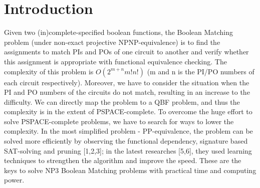\section{Introduction}
Given two (in)complete-specified boolean functions, the Boolean Matching problem (under non-exact projective NPNP-equivalence) is to find the assignments to match PIs and POs of one circuit to another and verify whether this assignment is appropriate with functional equivalence checking. The complexity of this problem is $O(2^{m+n}m!n!)$ (m and n is the PI/PO numbers of each circuit respectively). Moreover, we have to consider the situation when the PI and PO numbers of the circuits do not match, resulting in an increase to the difficulty. We can directly map the problem to a QBF problem, and thus the complexity is in the extent of PSPACE-complete. To overcome the huge effort to solve PSPACE-complete problems, we have to search for ways to lower the complexity. In the most simplified problem - PP-equivalence, the problem can be solved more efficiently by observing the functional dependency, signature based SAT-solving and pruning [1,2,3]; in the latest researches [5,6], they used learning techniques to strengthen the algorithm and improve the speed. These are the keys to solve NP3 Boolean Matching problems with practical time and computing power.


%
%

